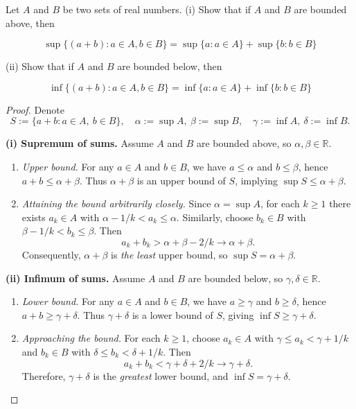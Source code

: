 \documentclass[10pt]{extarticle}
\begin{document}
\begin{exercise}[6.4]
    Let $A$ and $B$ be two sets of real numbers.
    (i) Show that if $A$ and $B$ are bounded above, then

    \begin{equation*}
        \sup \{(a+b): a \in A, b \in B\}=\sup \{a: a \in A\}+\sup \{b: b \in B\}
    \end{equation*}

    (ii) Show that if $A$ and $B$ are bounded below, then

    \begin{equation*}
        \inf \{(a+b): a \in A, b \in B\}=\inf \{a: a \in A\}+\inf \{b: b \in B\}
    \end{equation*}

\end{exercise}
\begin{proof}
    Denote
    \[
        S := \{a + b : a \in A,\ b \in B\}, \quad \alpha := \sup A,\ \beta := \sup B, \quad \gamma := \inf A,\ \delta := \inf B.
    \]

    \medskip
    \textbf{(i) Supremum of sums.} Assume $A$ and $B$ are bounded above, so $\alpha, \beta \in \mathbb{R}$.
    \begin{enumerate}
        \item \emph{Upper bound.} For any $a \in A$ and $b \in B$, we have $a \leq \alpha$ and $b \leq \beta$, hence $a + b \leq \alpha + \beta$. Thus $\alpha + \beta$ is an upper bound of $S$, implying $\sup S \leq \alpha + \beta$.
        \item \emph{Attaining the bound arbitrarily closely.} Since $\alpha = \sup A$, for each $k \geq 1$ there exists $a_k \in A$ with $\alpha - 1/k < a_k \leq \alpha$. Similarly, choose $b_k \in B$ with $\beta - 1/k < b_k \leq \beta$. Then
              \[
                  a_k + b_k > \alpha + \beta - 2/k \longrightarrow \alpha + \beta.
              \]
              Consequently, $\alpha + \beta$ is \emph{the least} upper bound, so $\sup S = \alpha + \beta$.
    \end{enumerate}

    \medskip
    \textbf{(ii) Infimum of sums.} Assume $A$ and $B$ are bounded below, so $\gamma, \delta \in \mathbb{R}$.
    \begin{enumerate}
        \item \emph{Lower bound.} For any $a \in A$ and $b \in B$, we have $a \geq \gamma$ and $b \geq \delta$, hence $a + b \geq \gamma + \delta$. Thus $\gamma + \delta$ is a lower bound of $S$, giving $\inf S \geq \gamma + \delta$.
        \item \emph{Approaching the bound.} For each $k \geq 1$, choose $a_k \in A$ with $\gamma \leq a_k < \gamma + 1/k$ and $b_k \in B$ with $\delta \leq b_k < \delta + 1/k$. Then
              \[
                  a_k + b_k < \gamma + \delta + 2/k \longrightarrow \gamma + \delta.
              \]
              Therefore, $\gamma + \delta$ is the \emph{greatest} lower bound, and $\inf S = \gamma + \delta$.
    \end{enumerate}
\end{proof}
\end{document}
